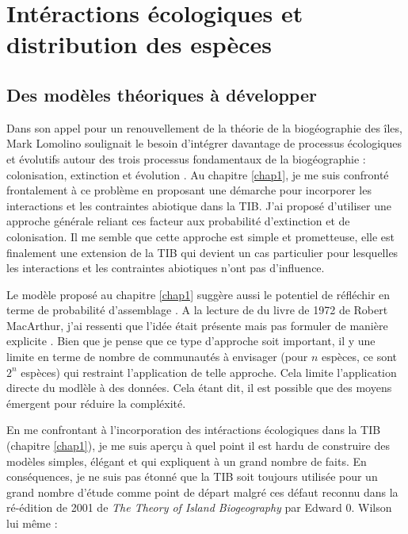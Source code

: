 \section*{Intéractions écologiques et distribution des
espèces}\label{intuxe9ractions-uxe9cologiques-et-distribution-des-espuxe8ces}

\subsection*{Des modèles théoriques à
développer}\label{des-moduxe8les-thuxe9oriques-uxe0-duxe9velopper}

Dans son appel pour un renouvellement de la théorie de la biogéographie
des îles, Mark Lomolino soulignait le besoin d'intégrer davantage de
processus écologiques et évolutifs autour des trois processus
fondamentaux de la biogéographie : colonisation, extinction et évolution
\citep{Lomolino2000}. Au chapitre \ref{chap1}, je me suis confronté
frontalement à ce problème en proposant une démarche pour incorporer les
interactions et les contraintes abiotique dans la TIB. J'ai proposé
d'utiliser une approche générale reliant ces facteur aux probabilité
d'extinction et de colonisation. Il me semble que cette approche est
simple et prometteuse, elle est finalement une extension de la TIB qui
devient un cas particulier pour lesquelles les interactions et les
contraintes abiotiques n'ont pas d'influence.

Le modèle proposé au chapitre \ref{chap1} suggère aussi le potentiel de
réfléchir en terme de probabilité d'assemblage \citep{Cazelles2015}. A
la lecture de du livre de 1972 de Robert MacArthur, j'ai ressenti que
l'idée était présente mais pas formuler de manière explicite
\citep{macarthur1972geographical}. Bien que je pense que ce type
d'approche soit important, il y une limite en terme de nombre de
communautés à envisager (pour \(n\) espèces, ce sont \(2^n\) espèces)
qui restraint l'application de telle approche. Cela limite l'application
directe du modlèle à des données. Cela étant dit, il est possible que
des moyens émergent pour réduire la compléxité.

En me confrontant à l'incorporation des intéractions écologiques dans la
TIB (chapitre \ref{chap1}), je me suis aperçu à quel point il est hardu
de construire des modèles simples, élégant et qui expliquent à un grand
nombre de faits. En conséquences, je ne suis pas étonné que la TIB soit
toujours utilisée pour un grand nombre d'étude comme point de départ
malgré ces défaut reconnu dans la ré-édition de 2001 de \emph{The Theory
of Island Biogeography} par Edward 0. Wilson lui même :

